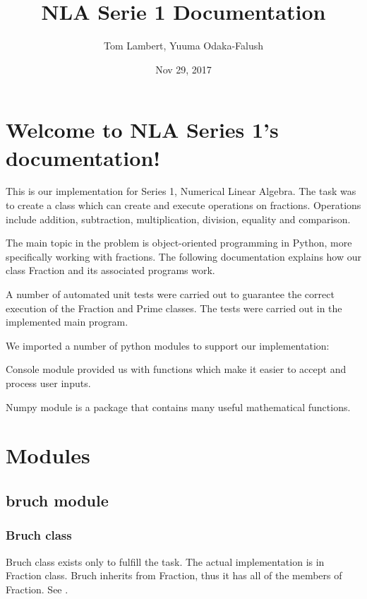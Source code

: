\documentclass[letterpaper,10pt,english]{sphinxhowto}
\title{NLA Serie 1 Documentation}
\date{Nov 29, 2017}
\author{Tom Lambert, Yuuma Odaka-Falush}
\begin{document}
\maketitle
\sphinxtableofcontents
{}\label{\detokenize{index::doc}}



\section{Welcome to NLA Series 1’s documentation!}
\label{\detokenize{index:welcome-to-nla-series-1-s-documentation}}\label{\detokenize{index:nothing-to-see-here}}
This is our implementation for Series 1, Numerical Linear Algebra.
The task was to create a class which can create and execute operations on fractions.
Operations include addition, subtraction, multiplication, division, equality and comparison.

The main topic in the problem is object-oriented programming in Python, more specifically working with fractions.
The following documentation explains how our class Fraction and its associated programs work.

A number of automated unit tests were carried out to guarantee the correct execution of the Fraction and Prime classes.
The tests were carried out in the implemented main program.

We imported a number of python modules to support our implementation:

Console module provided us with functions which make it easier to accept and process user inputs.

Numpy module is a package that contains many useful mathematical functions.


\section{Modules}
\label{\detokenize{index:modules}}

\subsection{bruch module}
\label{\detokenize{bruch::doc}}\label{\detokenize{bruch:bruch-module}}

\subsubsection{Bruch class}
\label{\detokenize{bruch:bruch-class}}
Bruch class exists only to fulfill the task. The actual implementation is in Fraction class.
Bruch inherits from Fraction, thus it has all of the members of Fraction.
See {\hyperref[\detokenize{fraction:fraction-class}]{}}.
\label{\detokenize{bruch:module-bruch}}
\end{document}
